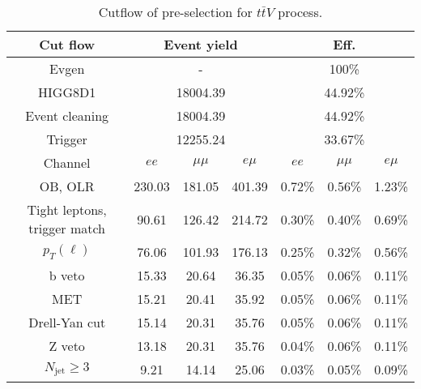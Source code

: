 \begin{table}
\centering\small
\begin{tabular}{c|ccc|ccc}
\hline
\hline
Cut flow &\multicolumn{3}{c|}{Event yield}&\multicolumn{3}{c}{Eff.}      \\
\hline
Evgen&\multicolumn{3}{c|}{-}&\multicolumn{3}{c}{100\%}\\
HIGG8D1&\multicolumn{3}{c|}{18004.39}&\multicolumn{3}{c}{44.92\%}\\
Event cleaning&\multicolumn{3}{c|}{18004.39}&\multicolumn{3}{c}{44.92\%}\\
Trigger&\multicolumn{3}{c|}{12255.24    }&\multicolumn{3}{c}{33.67\%}\\
Channel&$ee$&$\mu\mu$&$e\mu$&$ee$&$\mu\mu$&$e\mu$\\
\hline
OB, OLR    &230.03    &181.05    &401.39& 0.72\%    &0.56\%    &1.23\%\\
Tight leptons, trigger match    &90.61    &126.42    &214.72    &0.30\%    &0.40\%    &0.69\%\\
$p_T(\ell)$    &76.06    &101.93    &176.13    &0.25\%    &0.32\%    &0.56\%\\
b veto    &15.33    &20.64    &36.35    &0.05\%    &0.06\%    &0.11\%\\
MET    &15.21    &20.41    &35.92    &0.05\%    &0.06\%    &0.11\%\\
Drell-Yan cut    &15.14    &20.31    &35.76    &0.05\%    &0.06\%    &0.11\%\\
Z veto    &13.18    &20.31    &35.76    &0.04\%    &0.06\%    &0.11\%\\
$N_{\text{jet}}\geq3$    &9.21    &14.14    &25.06    &0.03\%    &0.05\%    &0.09\%\\
\hline
\hline
\end{tabular}
\caption{Cutflow of pre-selection for $t\bar{t}V$ process.}
\label{tab:cut_flow_preselection_ttV}
\end{table}
